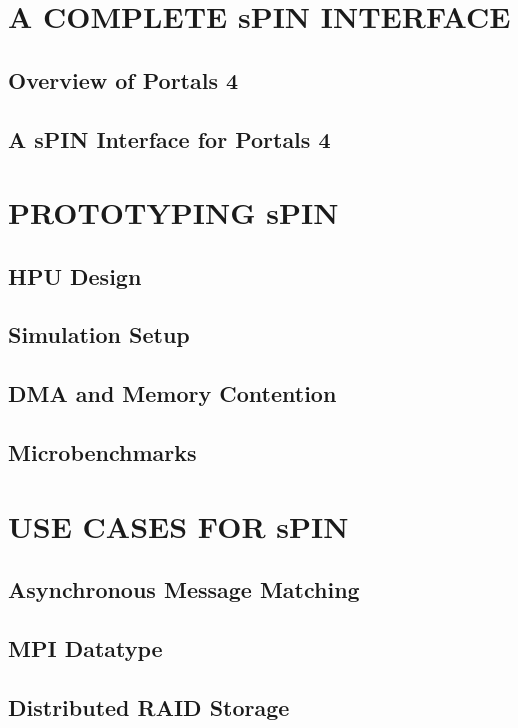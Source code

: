 \documentclass[cn,pad,11pt,green,geye]{../elegantnote}
\begin{document}
\section{A COMPLETE sPIN INTERFACE}

\subsection{Overview of Portals 4}

\subsection{A sPIN Interface for Portals 4}


\section{PROTOTYPING sPIN}

\subsection{HPU Design}

\subsection{Simulation Setup}

\subsection{DMA and Memory Contention}

\subsection{Microbenchmarks}


\section{USE CASES FOR sPIN}

\subsection{Asynchronous Message Matching}

\subsection{MPI Datatype}

\subsection{Distributed RAID Storage}
\end{document}
